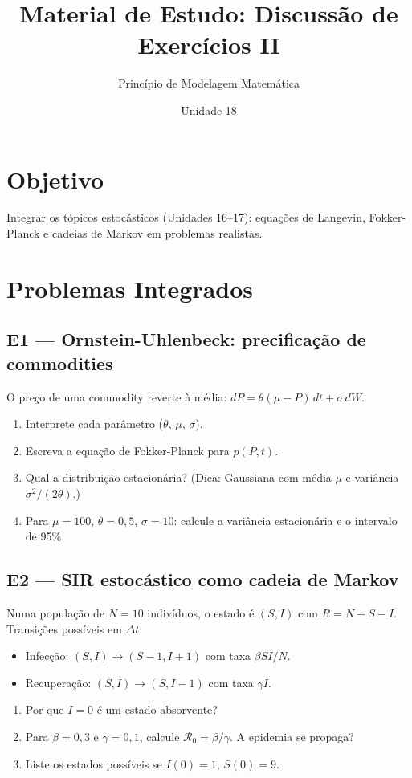 \documentclass[12pt,a4paper]{article}
\title{Material de Estudo: Discuss\~ao de Exerc\'icios II}
\author{Princ\'ipio de Modelagem Matem\'atica}
\date{Unidade 18}
\begin{document}
\maketitle

\section*{Objetivo}
Integrar os t\'opicos estoc\'asticos (Unidades 16--17): equa\c{c}\~oes de Langevin, Fokker-Planck e cadeias de Markov em problemas realistas.

\section*{Problemas Integrados}

\subsection*{E1 --- Ornstein-Uhlenbeck: precifica\c{c}\~ao de commodities}
O pre\c{c}o de uma commodity reverte \`a m\'edia: $dP = \theta(\mu - P)\,dt + \sigma\,dW$.
\begin{enumerate}
  \item[$a.$] Interprete cada par\^ametro ($\theta$, $\mu$, $\sigma$).
  \item[$b.$] Escreva a equa\c{c}\~ao de Fokker-Planck para $p(P,t)$.
  \item[$c.$] Qual a distribui\c{c}\~ao estacion\'aria? (Dica: Gaussiana com m\'edia $\mu$ e vari\^ancia $\sigma^2/(2\theta)$.)
  \item[$d.$] Para $\mu=100$, $\theta=0{,}5$, $\sigma=10$: calcule a vari\^ancia estacion\'aria e o intervalo de 95\%.
\end{enumerate}

\subsection*{E2 --- SIR estoc\'astico como cadeia de Markov}
Numa popula\c{c}\~ao de $N=10$ indiv\'iduos, o estado \'e $(S, I)$ com $R = N-S-I$.
Transi\c{c}\~oes poss\'iveis em $\Delta t$:
\begin{itemize}
  \item Infec\c{c}\~ao: $(S, I) \to (S-1, I+1)$ com taxa $\beta SI/N$.
  \item Recupera\c{c}\~ao: $(S, I) \to (S, I-1)$ com taxa $\gamma I$.
\end{itemize}
\begin{enumerate}
  \item[$a.$] Por que $I=0$ \'e um estado absorvente?
  \item[$b.$] Para $\beta=0{,}3$ e $\gamma=0{,}1$, calcule $\mathcal{R}_0 = \beta/\gamma$. A epidemia se propaga?
  \item[$c.$] Liste os estados poss\'iveis se $I(0)=1$, $S(0)=9$.
\end{enumerate}
\end{document}
